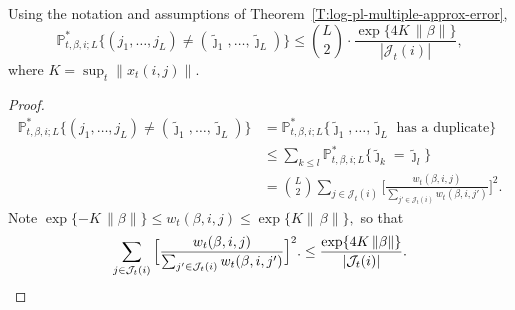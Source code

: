 \documentclass[aoas,preprint]{imsart}
\begin{document}
\begin{lemma}\label{L:coupling-prob-bound}
Using the notation and assumptions of 
Theorem~\ref{T:log-pl-multiple-approx-error},
\[
    \mathbb{P}^\ast_{t,\beta,i;L}
    \Big\{
        (j_1, \ldots, j_L)
            \neq
            (\tilde \jmath_1, \ldots, \tilde \jmath_L)
    \Big\}
        \leq
        {L \choose 2}
        \cdot
        \frac{\exp\{4 K \, \| \beta \|\}}{| \mathcal{J}_t(i) |},
\]
where $K = \sup_t \| x_t(i,j) \|$.
\end{lemma}
\begin{proof}
\begin{align*}
    \mathbb{P}^\ast_{t,\beta,i;L}
    \Big\{
        (j_1, \ldots, j_L)
            \neq
            (\tilde \jmath_1, \ldots, \tilde \jmath_L)
    \Big\}
        &=
        \mathbb{P}^\ast_{t,\beta,i;L}
        \Big\{
            \text{$\tilde \jmath_1, \ldots, \tilde \jmath_L$ has a duplicate}
        \} \\
        &\leq
        \sum_{k \leq l}
            \mathbb{P}^\ast_{t,\beta,i;L}
            \Big\{
                \tilde \jmath_k = \tilde \jmath_l
            \Big\} \\
        &=
            {L \choose 2}
            \sum_{j \in \mathcal{J}_t(i)}
                \Big[
                    \frac{
                        w_t(\beta, i, j)
                    }{
                        \sum_{j' \in \mathcal{J}_t(i)} w_t(\beta, i, j')
                    }
                \Big]^2.
\end{align*}
Note
\(
    \exp\{-K \, \| \beta \|\}
        \leq w_t(\beta,i,j)
        \leq \exp\{K \| \, \beta \|\},
\)
so that
\[
    \sum_{j \in \mathcal{J}_t(i)}
        \Big[
            \frac{
                w_t(\beta, i, j)
            }{
                \sum_{j' \in \mathcal{J}_t(i)} w_t(\beta, i, j')
            }
        \Big]^2.
    \leq
        \frac{\exp\{4 K \, \| \beta \|\}}{| \mathcal{J}_t(i) |}.
    \qedhere
\]    
\end{proof}
\end{document}
